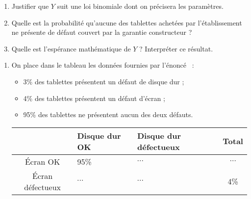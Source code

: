 \par
\begin{enumerate}
     \par
     \item %
     Justifier que $Y$ suit une loi binomiale dont on précisera les paramètres.
     \par
     \item %
     Quelle est la probabilité qu'aucune des tablettes achetées par l'établissement ne présente de défaut couvert par la garantie constructeur ?
     \par
     \item %
     Quelle est l'espérance mathématique de $Y$ ? Interpréter ce résultat.
     \par
\end{enumerate}
\begin{corrige}
     \par
     \begin{enumerate}
          \par
          \item %
          \par
          On place dans le tableau les données fournies par l'énoncé ~:
          \par
          \begin{itemize}
               \item %
               3\% des tablettes présentent un défaut de disque dur ;
               \item %
               4\% des tablettes présentent un défaut d'écran ;
               \item %
               95\% des tablettes ne présentent aucun des deux défauts.
          \end{itemize}
          \begin{center}
               \begin{tabular}{|c|p{2cm}|p{2cm}|c|}%
                    \hline
                    $\ $ & Disque dur OK & Disque dur défectueux & Total \\
                    \hline
                    \'Ecran OK &  95\% & $\cdots$ & $\cdots$ \\
                    \hline
                    \'Ecran défectueux & $\cdots$ & $\cdots$ & 4\% \\

\end{tabular}
\end{center}
\end{enumerate}
\end{corrige}
